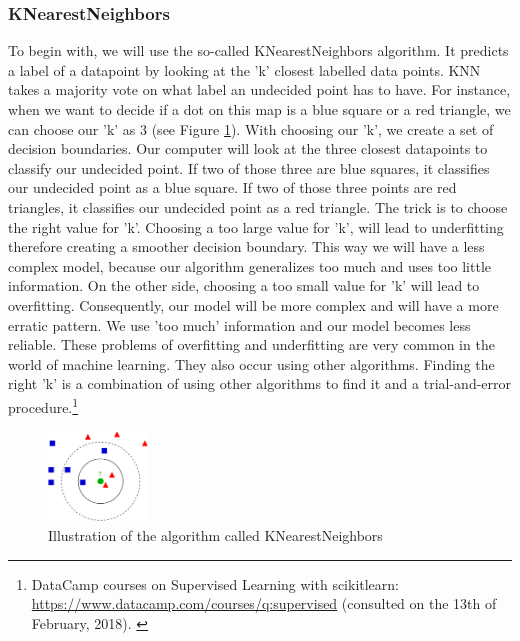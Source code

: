 \documentclass[11pt]{article}
\begin{document}
\subsubsection{KNearestNeighbors}
\label{sec:org01e5c34}

To begin with, we will use the so-called KNearestNeighbors algorithm. It predicts a label of a datapoint by looking at the 'k' closest labelled data points. KNN takes a majority vote on what label an undecided point has to have. For instance, when we want to decide if a dot on this map is a blue square or a red triangle, we can choose our 'k' as 3 (see Figure \ref{tab:knn}). With choosing our 'k', we create a set of decision boundaries. Our computer will look at the three closest datapoints to classify our undecided point. If two of those three are blue squares, it classifies our undecided point as a blue square. If two of those three points are red triangles, it classifies our undecided point as a red triangle. The trick is to choose the right value for 'k'. Choosing a too large value for 'k', will lead to underfitting therefore creating a smoother decision boundary. This way we will have a less complex model, because our algorithm generalizes too much and uses too little information. On the other side, choosing a too small value for 'k' will lead to overfitting. Consequently, our model will be more complex and will have a more erratic pattern. We use 'too much' information and our model becomes less reliable. These problems of overfitting and underfitting are very common in the world of machine learning. They also occur using other algorithms. Finding the right 'k' is a combination of using other algorithms to find it and a trial-and-error procedure.\footnote{DataCamp courses on Supervised Learning with scikitlearn: \url{https://www.datacamp.com/courses/q:supervised} (consulted on the 13th of February, 2018). \label{fn:datacamp}}

\begin{figure}[htbp]
\centering
\includegraphics[width=100px]{./KnnClassification.png}
\caption{\label{tab:knn}
Illustration of the algorithm called KNearestNeighbors}
\end{figure} 
\end{document}
